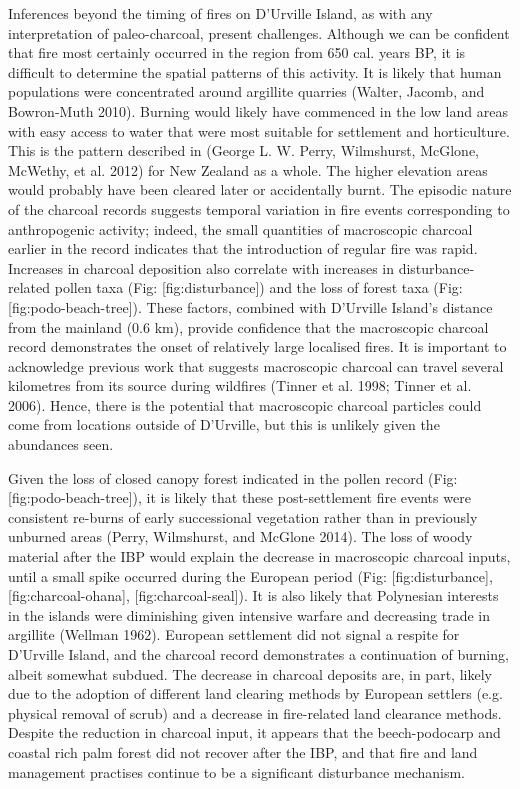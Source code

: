 \documentclass[]{article}
\begin{document}
Inferences beyond the timing of fires on D'Urville Island, as with any interpretation of paleo-charcoal, present challenges. Although we can be confident that fire most certainly occurred in the region from 650 cal. years BP, it is difficult to determine the spatial patterns of this activity. It is likely that human populations were concentrated around argillite quarries (Walter, Jacomb, and Bowron-Muth 2010). Burning would likely have commenced in the low land areas with easy access to water that were most suitable for settlement and horticulture. This is the pattern described in (George L. W. Perry, Wilmshurst, McGlone, McWethy, et al. 2012) for New Zealand as a whole. The higher elevation areas would probably have been cleared later or accidentally burnt. The episodic nature of the charcoal records suggests temporal variation in fire events corresponding to anthropogenic activity; indeed, the small quantities of macroscopic charcoal earlier in the record indicates that the introduction of regular fire was rapid. Increases in charcoal deposition also correlate with increases in disturbance-related pollen taxa (Fig: {[}fig:disturbance{]}) and the loss of forest taxa (Fig: {[}fig:podo-beach-tree{]}). These factors, combined with D'Urville Island's distance from the mainland (0.6 km), provide confidence that the macroscopic charcoal record demonstrates the onset of relatively large localised fires. It is important to acknowledge previous work that suggests macroscopic charcoal can travel several kilometres from its source during wildfires (Tinner et al. 1998; Tinner et al. 2006). Hence, there is the potential that macroscopic charcoal particles could come from locations outside of D'Urville, but this is unlikely given the abundances seen.

Given the loss of closed canopy forest indicated in the pollen record (Fig: {[}fig:podo-beach-tree{]}), it is likely that these post-settlement fire events were consistent re-burns of early successional vegetation rather than in previously unburned areas (Perry, Wilmshurst, and McGlone 2014). The loss of woody material after the IBP would explain the decrease in macroscopic charcoal inputs, until a small spike occurred during the European period (Fig: {[}fig:disturbance{]}, {[}fig:charcoal-ohana{]}, {[}fig:charcoal-seal{]}). It is also likely that Polynesian interests in the islands were diminishing given intensive warfare and decreasing trade in argillite (Wellman 1962). European settlement did not signal a respite for D'Urville Island, and the charcoal record demonstrates a continuation of burning, albeit somewhat subdued. The decrease in charcoal deposits are, in part, likely due to the adoption of different land clearing methods by European settlers (e.g. physical removal of scrub) and a decrease in fire-related land clearance methods. Despite the reduction in charcoal input, it appears that the beech-podocarp and coastal rich palm forest did not recover after the IBP, and that fire and land management practises continue to be a significant disturbance mechanism.
\end{document}
